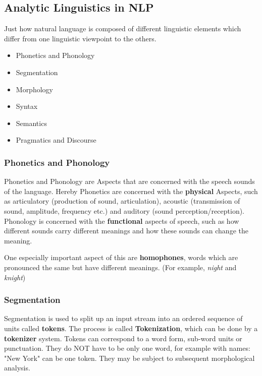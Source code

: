 \documentclass[
../../NLP4W_Summary.tex,
]
{subfiles}
\begin{document}
\subsection{Analytic Linguistics in NLP}
Just how natural language is composed of different linguistic elements which differ from one linguistic viewpoint to the others.

\begin{greenbox}
    \begin{itemize}
        \item Phonetics and Phonology
        \item Segmentation
        \item Morphology
        \item Syntax
        \item Semantics
        \item Pragmatics and Discourse
    \end{itemize}
\end{greenbox}

\subsubsection{Phonetics and Phonology}
Phonetics and Phonology are Aspects that are concerned with the speech sounds of the language.
Hereby Phonetics are concerned with the \textbf{physical} Aspects, such as articulatory (production of sound, articulation), acoustic (transmission of sound, amplitude, frequency etc.) and auditory (sound perception/reception).
Phonology is concerned with the \textbf{functional} aspects of speech, such as how different sounds carry different meanings and how these sounds can change the meaning.

One especially important aspect of this are \textbf{homophones}, words which are pronounced the same but have different meanings. (For example, \textit{night} and \textit{knight})

\subsubsection{Segmentation}
Segmentation is used to split up an input stream into an ordered sequence of units called \textbf{tokens}. The process is called \textbf{Tokenization}, which can be done by a \textbf{tokenizer} system.
Tokens can correspond to a word form, sub-word units or punctuation. 
They do NOT have to be only one word, for example with names: "New York" can be one token.
They may be subject to subsequent morphological analysis.
\end{document}
